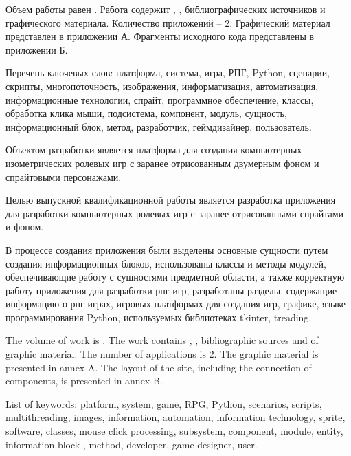 
Объем работы равен . Работа содержит , ,  библиографических источников и  графического материала. Количество приложений – 2. Графический материал представлен в приложении А. Фрагменты исходного кода представлены в приложении Б.

Перечень ключевых слов: платформа, система, игра, РПГ, Python, сценарии, скрипты, многопоточность, изображения, информатизация, автоматизация, информационные технологии, спрайт,  программное обеспечение, классы, обработка клика мыши, подсистема, компонент, модуль, сущность, информационный блок, метод, разработчик, геймдизайнер, пользователь.

Объектом разработки является платформа для создания компьютерных изометрических ролевых игр с заранее отрисованным двумерным фоном и спрайтовыми персонажами.

Целью выпускной квалификационной работы является разработка приложения для разработки компьютерных ролевых игр с заранее отрисованными спрайтами и фоном.

В процессе создания приложения были выделены основные сущности путем создания информационных блоков, использованы классы и методы модулей, обеспечивающие работу с сущностями предметной области, а также корректную работу приложения для разработки рпг-игр, разработаны разделы, содержащие информацию о рпг-играх, игровых платформах для создания игр, графике, языке программирования Python, используемых библиотеках tkinter, treading.

  
The volume of work is . The work contains , ,  bibliographic sources and  of graphic material. The number of applications is 2. The graphic material is presented in annex A. The layout of the site, including the connection of components, is presented in annex B.

List of keywords: platform, system, game, RPG, Python, scenarios, scripts, multithreading, images, information, automation, information technology, sprite, software, classes, mouse click processing, subsystem, component, module, entity, information block , method, developer, game designer, user.


